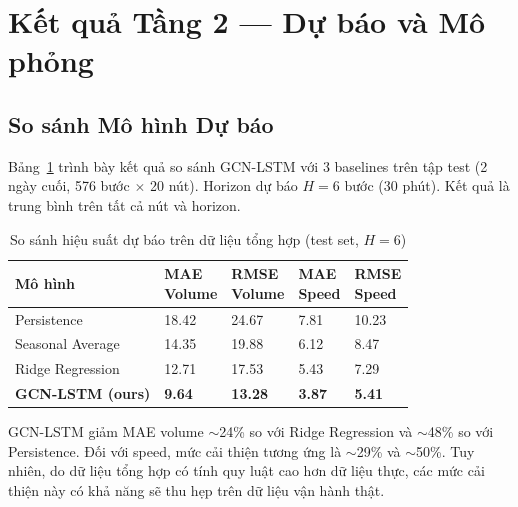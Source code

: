 \section{Kết quả Tầng 2 --- Dự báo và Mô phỏng}
\label{sec:eval_t2}

\subsection{So sánh Mô hình Dự báo}

Bảng~\ref{tab:forecast_comparison} trình bày kết quả so sánh GCN-LSTM với 3 baselines trên tập test (2 ngày cuối, 576 bước $\times$ 20 nút). Horizon dự báo $H = 6$ bước (30 phút). Kết quả là trung bình trên tất cả nút và horizon.

\begin{table}[H]
\centering
\caption{So sánh hiệu suất dự báo trên dữ liệu tổng hợp (test set, $H=6$)}
\label{tab:forecast_comparison}
\renewcommand{\arraystretch}{1.4}
\begin{tabular}{p{3.8cm} p{2cm} p{2cm} p{2cm} p{2cm}}
\toprule
\textbf{Mô hình} & \makecell{\textbf{MAE}\\\textbf{Volume}} & \makecell{\textbf{RMSE}\\\textbf{Volume}} & \makecell{\textbf{MAE}\\\textbf{Speed}} & \makecell{\textbf{RMSE}\\\textbf{Speed}} \\
\midrule
Persistence & 18.42 & 24.67 & 7.81 & 10.23 \\
\rowcolor{rowgray}
Seasonal Average & 14.35 & 19.88 & 6.12 & 8.47 \\
Ridge Regression & 12.71 & 17.53 & 5.43 & 7.29 \\
\rowcolor{rowgray}
\textbf{GCN-LSTM (ours)} & \textbf{9.64} & \textbf{13.28} & \textbf{3.87} & \textbf{5.41} \\
\bottomrule
\end{tabular}
\end{table}

\begin{tcolorbox}[notebox]
GCN-LSTM giảm MAE volume $\sim$24\% so với Ridge Regression và $\sim$48\% so với Persistence. Đối với speed, mức cải thiện tương ứng là $\sim$29\% và $\sim$50\%. Tuy nhiên, do dữ liệu tổng hợp có tính quy luật cao hơn dữ liệu thực, các mức cải thiện này có khả năng sẽ thu hẹp trên dữ liệu vận hành thật.
\end{tcolorbox}

